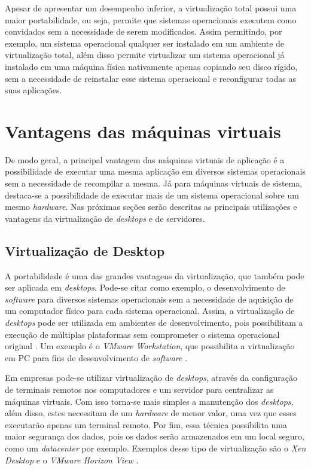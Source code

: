 Apesar de apresentar um desempenho inferior, a virtualização total possui uma maior portabilidade, ou seja, permite que sistemas operacionais 
executem como convidados sem a necessidade de serem modificados. Assim permitindo, por exemplo, um sistema operacional qualquer ser instalado 
em um ambiente de virtualização total, além disso permite virtualizar um sistema operacional já instalado em uma máquina física nativamente 
apenas copiando seu disco rígido, sem a necessidade de reinstalar esse sistema operacional e reconfigurar todas as suas aplicações.

\section{Vantagens das máquinas virtuais}
\label{section:virtvantag}

De modo geral, a principal vantagem das máquinas virtuais de aplicação é a possibilidade de executar uma mesma aplicação em diversos sistemas 
operacionais sem a necessidade de recompilar a mesma. Já para máquinas virtuais de sistema, destaca-se a possibilidade de executar mais de um 
sistema operacional sobre um mesmo \textit{hardware}. Nas próximas seções serão descritas as principais utilizações e vantagens da virtualização 
de \textit{desktops} e de servidores.

\subsection{Virtualização de Desktop}
\label{section:virtdesk}

A portabilidade é uma das grandes vantagens da virtualização, que também pode ser aplicada em \textit{desktops}. Pode-se citar como exemplo, 
o desenvolvimento de \textit{software} para diversos sistemas operacionais sem a necessidade de aquisição de um computador físico para cada 
sistema operacional. Assim, a virtualização de \textit{desktops} pode ser utilizada em ambientes de desenvolvimento, pois possibilitam 
a execução de múltiplas plataformas sem comprometer o sistema operacional original \cite{carissimi2008}. Um exemplo é o 
\textit{VMware Workstation}, que possibilita a virtualização em \ac{PC} para fins de desenvolvimento de \textit{software} \cite{vmware2016}.

Em empresas pode-se utilizar virtualização de \textit{desktops}, através da configuração de terminais remotos nos computadores e um servidor 
para centralizar as máquinas virtuais. Com isso torna-se mais simples a manutenção dos \textit{desktops}, além disso, estes necessitam de um 
\textit{hardware} de menor valor, uma vez que esses executarão apenas um terminal remoto. Por fim, essa técnica possibilita uma maior segurança 
dos dados, pois os dados serão armazenados em um local seguro, como um \textit{datacenter} por exemplo. Exemplos desse tipo de virtualização 
são o \textit{Xen Desktop} \cite{xendesktop} e o \textit{VMware Horizon View} \cite{vmwareview}.


